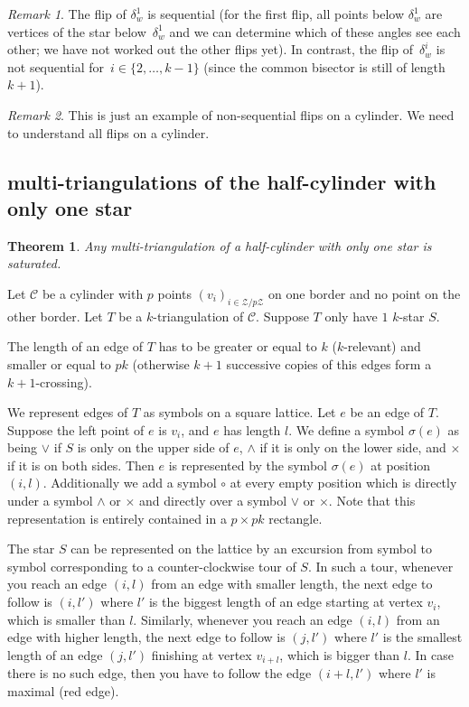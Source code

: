 \documentclass{amsart}
\newtheorem{theorem}{Theorem}[section]
\theoremstyle{remark}
\newtheorem{remark}{Remark}[section]
\begin{document}
\begin{remark}
The flip of $\delta_w^1$ is sequential (for the first flip, all points below $\delta_w^1$ are vertices of the star below~$\delta_w^1$ and we can determine which of these angles see each other; we have not worked out the other flips yet).
In contrast, the flip of~$\delta_w^i$ is not sequential for~$i \in \{2, \dots, k-1\}$ (since the common bisector is still of length~$k+1$).
\end{remark}

\begin{remark}
This is just an example of non-sequential flips on a cylinder. We need to understand all flips on a cylinder.
\end{remark}


\subsection{multi-triangulations of the half-cylinder with only one star}

\begin{theorem}\label{thm:uniStarSaturated}
Any multi-triangulation of a half-cylinder with only one star is saturated.
\end{theorem} 

Let $\mathcal{C}$ be a cylinder with $p$ points $(v_i)_{i\in\mathcal{Z}/p\mathcal{Z}}$ on one border and no point on the other border. Let $T$ be a $k$-triangulation of $\mathcal{C}$. Suppose $T$ only have $1$ $k$-star $S$.

The length of an edge of $T$ has to be greater or equal to $k$ ($k$-relevant) and smaller or equal to $pk$ (otherwise $k+1$ successive copies of this edges 
form a $k+1$-crossing).

We represent edges of $T$ as symbols on a square lattice.
Let $e$ be an edge of $T$. Suppose the left point of $e$ is $v_i$, and $e$ has length $l$. 
We define a symbol $\sigma(e)$ as being $\vee$ if $S$ is only on the upper side of $e$, $\wedge$ if it is only on the lower side, and $\times$ if it is on both sides.
Then $e$ is represented by the symbol $\sigma(e)$ at position $(i,l)$.
Additionally we add a symbol $\circ$ at every empty position which is directly under a symbol $\wedge$ or $\times$ and directly over a symbol $\vee$ or $\times$.
Note that this representation is entirely contained in a $p\times pk$ rectangle.

The star $S$ can be represented on the lattice by an excursion from symbol to symbol corresponding to a counter-clockwise tour of $S$.
In such a tour, whenever you reach an edge $(i,l)$ from an edge with smaller length, the next edge to follow is $(i,l')$ where $l'$ is the biggest length of an edge starting at vertex $v_i$, which is smaller than $l$.
Similarly, whenever you reach an edge $(i,l)$ from an edge with higher length, the next edge to follow is $(j,l')$ where $l'$ is the smallest length of an edge $(j,l')$ finishing at vertex $v_{i+l}$, which is bigger than $l$. In case there is no such edge, then you have to follow the edge $(i+l,l')$ where $l'$ is maximal (red edge).
\end{document}
